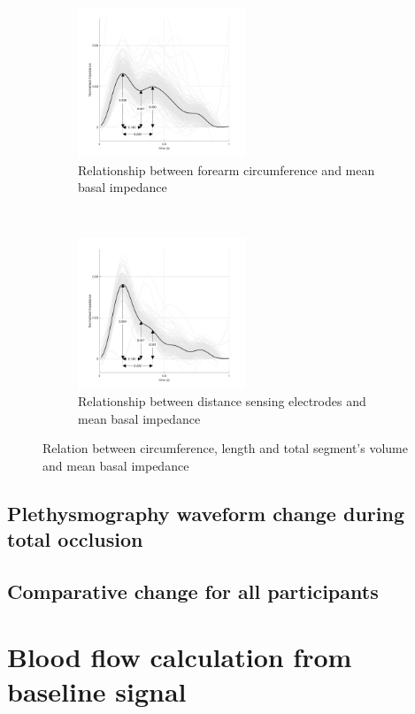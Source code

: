 \begin{figure}[t!]
	\centering
	\begin{subfigure}[t]{0.5\textwidth}
		\centering
		\includegraphics[height=4.5cm]{figure7a}
		\caption{Relationship between forearm circumference and mean basal impedance}
		\label{fig:iPG_arterial_baseline}
	\end{subfigure}%
	~ 
	\begin{subfigure}[t]{0.5\textwidth}
		\centering
		\includegraphics[height=4.5cm]{figure7b}
		\caption{Relationship between distance sensing electrodes and mean basal impedance}
		\label{fig:iPG_arterial_occlusion}
	\end{subfigure}
	\caption{Relation between circumference, length and total segment's volume and mean basal impedance}
	\label{fig:iPG_arterial}
\end{figure}

\subsection{Plethysmography waveform change during total occlusion}
\label{section5.3.3}

\subsection{Comparative change for all participants}
\label{section5.3.4}


\pagebreak
\section{Blood flow calculation from baseline signal}
\label{section5.4}

